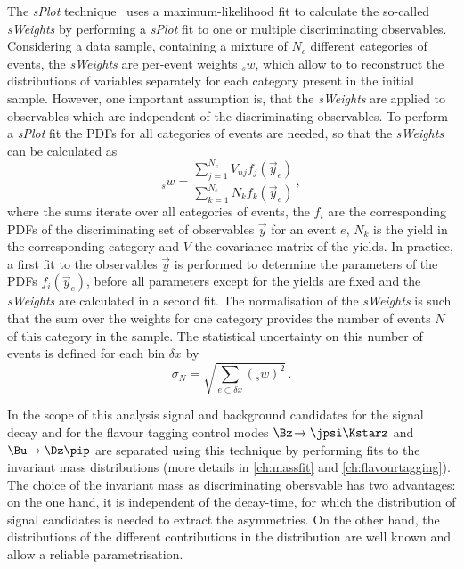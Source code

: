 The \emph{sPlot} technique~\cite{Pivk:2004ty} uses a maximum-likelihood fit to calculate the so-called \emph{sWeights} by performing a \emph{sPlot} fit to one or multiple discriminating observables.
Considering a data sample, containing a mixture of $N_c$ different categories of events, the \emph{sWeights} are per-event weights ${}_sw$, which allow to to reconstruct the distributions of variables separately for each category present in the initial sample.
However, one important assumption is, that the \emph{sWeights} are applied to observables which are independent of the discriminating observables.
To perform a \emph{sPlot} fit the PDFs for all categories of events are needed, so that the \emph{sWeights} can be calculated as
\begin{equation}
{}_sw=\frac{\sum_{j=1}^{N_c}V_{nj}f_j(\vec{y}_e)}{\sum_{k=1}^{N_c}N_kf_k(\vec{y}_e)}\,,
\end{equation}
where the sums iterate over all categories of events, the $f_i$ are the corresponding PDFs of the discriminating set of observables $\vec{y}$ for an event $e$, $N_k$ is the yield in the corresponding category and $V$ the covariance matrix of the yields.
In practice, a first fit to the observables $\vec{y}$ is performed to determine the parameters of the PDFs $f_i(\vec{y}_e)$, before all parameters except for the yields are fixed and the \emph{sWeights} are calculated in a second fit.
The normalisation of the \emph{sWeights} is such that the sum over the weights for one category provides the number of events $N$ of this category in the sample.
The statistical uncertainty on this number of events is defined for each bin $\delta x$ by
\begin{equation}
\sigma_N=\sqrt{\sum_{e\subset\delta x}({}_sw)^2}\,.
\end{equation}

In the scope of this analysis signal and background candidates for the signal decay \mbox{\BdToDpi} and for the flavour tagging control modes $\Bz\!\to\jpsi\Kstarz$ and $\Bu\!\to\Dz\pip$ are separated using this technique by performing fits to the invariant mass distributions (more details in \cref{ch:massfit} and \cref{ch:flavourtagging}).
The choice of the invariant mass as discriminating obersvable has two advantages:
on the one hand, it is independent of the decay-time, for which the distribution of signal candidates is needed to \eg extract the \CP asymmetries.
On the other hand, the distributions of the different contributions in the distribution are well known and allow a reliable parametrisation.
